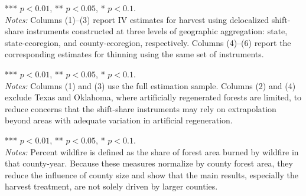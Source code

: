 \documentclass{article}
\begin{document}
\begin{table}[!htbp]
\centering
\caption*{Table A3. Robustness tests with alternative IV}
\resizebox{\textwidth}{!}{

}
\begin{minipage}{\textwidth}
\footnotesize
*** $p<0.01$, ** $p<0.05$, * $p<0.1$.\\
\textit{Notes:} Columns (1)–(3) report IV estimates for harvest using delocalized shift-share instruments constructed at three levels of geographic aggregation: state, state-ecoregion, and county-ecoregion, respectively. Columns (4)–(6) report the corresponding estimates for thinning using the same set of instruments.
\end{minipage}
\end{table}



\begin{table}[!htbp]
\centering
\caption*{Table A4. Plot-level robustness tests without Texas and Oklahoma}
\begin{minipage}{\textwidth}
\footnotesize
*** $p<0.01$, ** $p<0.05$, * $p<0.1$.\\
\textit{Notes:} Columns (1) and (3) use the full estimation sample. 
Columns (2) and (4) exclude Texas and Oklahoma, where artificially 
regenerated forests are limited, to reduce concerns that the shift-share 
instruments may rely on extrapolation beyond areas with adequate variation 
in artificial regeneration.
\end{minipage}
\end{table}
 



\begin{table}[!htbp]
\centering
\caption*{Table A5. Robustness tests for alternative wildfire indicators}
\begin{minipage}{\textwidth}
\footnotesize
*** $p<0.01$, ** $p<0.05$, * $p<0.1$.\\
\textit{Notes:} Percent wildfire is defined as the share of forest 
   area burned by wildfire in that county-year. Because these measures normalize by county forest area, they reduce the influence of
    county size and show that the main results, especially the harvest treatment, are not solely driven by larger counties. 
\end{minipage}
\end{table}
\end{document}
